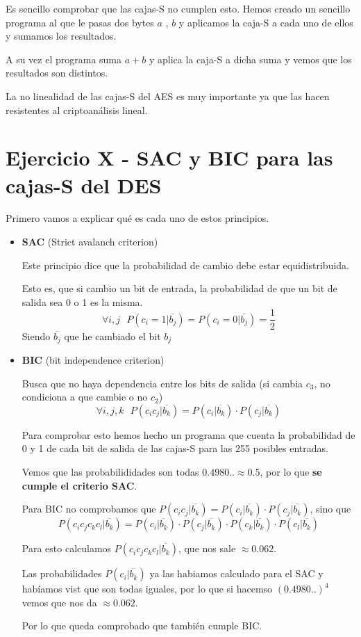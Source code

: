\documentclass{apuntes}
\begin{document}
Es sencillo comprobar que las cajas-S no cumplen esto. Hemos creado un sencillo programa al que le pasas dos bytes $a$ , $b$ y aplicamos la caja-S a cada uno de ellos y sumamos los resultados.

A su vez el programa suma $a + b$ y aplica la caja-S a dicha suma y vemos que los resultados son distintos.

La no linealidad de las cajas-S del AES es muy importante ya que las hacen resistentes al criptoanálisis lineal.

\section{Ejercicio X - SAC y BIC para las cajas-S del DES}

Primero vamos a explicar qué es cada uno de estos principios.

\begin{itemize}
	
	\item \textbf{SAC} (Strict avalanch criterion)
	
	Este principio dice que la probabilidad de cambio debe estar equidistribuida.
	
	Esto es, que si cambio un bit de entrada, la probabilidad de que un bit de salida sea 0 o 1 es la misma.
	$$\forall i,j\text{  }P(c_i=1|\overline{b_j})= P(c_i=0|\overline{b_j}) = \frac{1}{2}$$
	Siendo $\overline{b_j}$ que he cambiado el bit $b_j$
	
	\item \textbf{BIC} (bit independence criterion)
	
	Busca que no haya dependencia entre los bits de salida (si cambia $c_3$, no condiciona a que cambie o no $c_2$) 
	$$\forall i,j,k \text{  } P(c_ic_j|\overline{b_k}) = P(c_i|\overline{b_k})\cdot P(c_j|\overline{b_k})$$
	
	Para comprobar esto hemos hecho un programa que cuenta la probabilidad de 0 y 1 de cada bit de salida de las cajas-S para las 255 posibles entradas.
	
	Vemos que las probabilididades son todas $0.4980..\approx 0.5$, por lo que \textbf{se cumple el criterio SAC}.
	
	Para BIC no comprobamos que $ P(c_ic_j|\overline{b_k}) = P(c_i|\overline{b_k})\cdot P(c_j|\overline{b_k})$, sino que
	$$ P(c_ic_jc_kc_l|\overline{b_k}) = P(c_i|\overline{b_k})\cdot P(c_j|\overline{b_k})\cdot P(c_k|\overline{b_k})\cdot P(c_l|\overline{b_k})$$

	Para esto calculamos $P(c_ic_jc_kc_l|\overline{b_k})$, que nos sale $\approx 0.062$.
	
	Las probabilidades $P(c_i|\overline{b_k})$ ya las habiamos calculado para el SAC y habíamos vist que son todas iguales, por lo que si hacemso $(0.4980..)^4$ vemos que nos da $\approx 0.062$.
	
	Por lo que queda comprobado que también cumple BIC.
\end{itemize} 

\printindex
\end{document}
